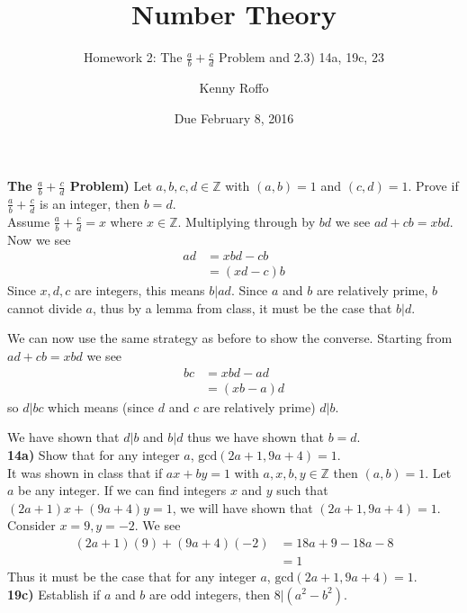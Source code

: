 \documentclass{scrartcl}
\title{Number Theory}
\subtitle{Homework 2: The $\frac{a}{b} + \frac{c}{d}$ Problem and 2.3) 14a, 19c, 23}
\author{Kenny Roffo}
\date{Due February 8, 2016}
\begin{document}
\maketitle

\textbf{The $\frac{a}{b} + \frac{c}{d}$ Problem)} Let $a,b,c,d\in\mathbb{Z}$ with $(a,b)=1$ and $(c,d)=1$. Prove if $\frac{a}{b}+\frac{c}{d}$ is an integer, then $b=d$.\\ 

Assume $\frac{a}{b}+\frac{c}{d} = x$ where $x\in\mathbb{Z}$. Multiplying through by $bd$ we see $ad+cb = xbd$. Now we see
\begin{align*}
  ad &= xbd - cb\\
  &= \left(xd-c\right)b
\end{align*}
Since $x,d,c$ are integers, this means $b|ad$. Since $a$ and $b$ are relatively prime, $b$ cannot divide $a$, thus by a lemma from class, it must be the case that $b|d$.

We can now use the same strategy as before to show the converse. Starting from $ad+cb = xbd$ we see
\begin{align*}
  bc &= xbd - ad\\
  &= \left(xb-a\right)d
\end{align*}
so $d|bc$ which means (since $d$ and $c$ are relatively prime) $d|b$.

We have shown that $d|b$ and $b|d$ thus we have shown that $b=d$.\\

\textbf{14a)} Show that for any integer $a$, $\text{gcd}(2a+1,9a+4)=1$.\\

It was shown in class that if $ax+by=1$ with $a,x,b,y\in\mathbb{Z}$ then $(a,b)=1$. Let $a$ be any integer. If we can find integers $x$ and $y$ such that $(2a+1)x+(9a+4)y=1$, we will have shown that $(2a+1,9a+4)=1$. Consider $x=9, y=-2$. We see
\begin{align*}
  (2a+1)(9) + (9a+4)(-2) &= 18a + 9 - 18a - 8\\
  &= 1
\end{align*}
Thus it must be the case that for any integer $a$, $\text{gcd}(2a+1,9a+4)=1$.\\

\textbf{19c)} Establish if $a$ and $b$ are odd integers, then $8|\left(a^2-b^2\right)$.\\
 
\end{document}
